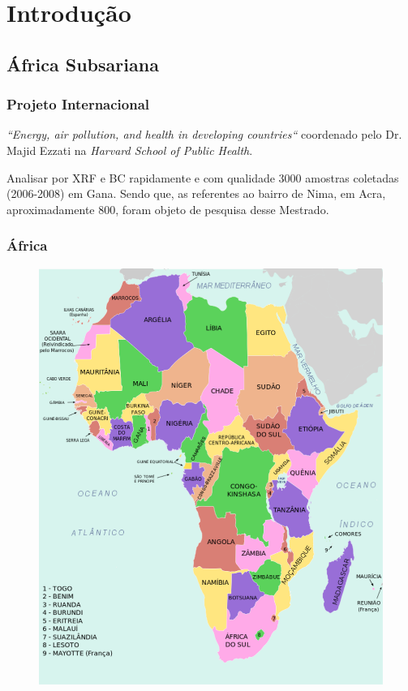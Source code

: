 \section{Introdução}

\subsection{África Subsariana}

\begin{frame}
  \frametitle{Projeto Internacional}
   \begin{tcolorbox}[colback=blue!5,colframe=blue!40!black,title=Projeto Internacional]
    \textit{``Energy, air pollution, and health in developing countries``}
             coordenado pelo Dr. Majid Ezzati na \textit{Harvard School of Public Health}.
   \end{tcolorbox}
   
   \begin{tcolorbox}[colback=blue!5,colframe=blue!40!black,title=Mestrado em Nima]
      Analisar por XRF e BC rapidamente e com qualidade 3000 amostras coletadas (2006-2008) em Gana. 
      Sendo que, as referentes ao bairro de Nima, em Acra, aproximadamente 800, foram objeto de pesquisa desse Mestrado.
   \end{tcolorbox}
  
\end{frame}

\begin{frame}
  \frametitle{África}
  \begin{figure}[H]
  \centering
  \includegraphics[width=0.55\linewidth]{../../inputs/images/africa_wikipedia.pdf}
  \end{figure}
\end{frame}

